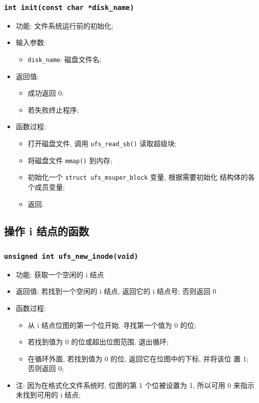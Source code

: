 \documentclass[nofonts, titlepage]{ctexart}
\begin{document}
\subsubsection[\texttt{init}]{\texttt{int init(const char *disk\_name)}}
        \begin{itemize}
\item
  功能: 文件系统运行前的初始化;
\item
  输入参数:

  \begin{itemize}
  \item
    \texttt{disk\_name}: 磁盘文件名;
  \end{itemize}
\item
  返回值:

  \begin{itemize}
  \item
    成功返回 0;
  \item
    若失败终止程序;
  \end{itemize}
\item
  函数过程:

  \begin{itemize}
  \item
    打开磁盘文件, 调用 \texttt{ufs\_read\_sb()} 读取超级块;
  \item
    将磁盘文件 \texttt{mmap()} 到内存;
  \item
    初始化一个 \texttt{struct ufs\_msuper\_block} 变量, 根据需要初始化
    结构体的各个成员变量;
  \item
    返回.
  \end{itemize}
  \end{itemize}
\subsection{操作 i 结点的函数}\label{ux7cfbux7edfux8c03ux7528ux63a5ux53e3}
  \subsubsection[\texttt{ufs\_new\_inode}]{\texttt{unsigned int ufs\_new\_inode(void)}}
  \begin{itemize}
\item
  功能: 获取一个空闲的 i 结点
\item
  返回值: 若找到一个空闲的 i 结点, 返回它的 i 结点号; 否则返回 0
\item
  函数过程:

  \begin{itemize}
  \item
    从 i 结点位图的第一个位开始, 寻找第一个值为 0 的位;
  \item
    若找到值为 0 的位或超出位图范围, 退出循环;
  \item
    在循环外面, 若找到值为 0 的位, 返回它在位图中的下标, 并将该位 置 1;
    否则返回 0;
  \end{itemize}
\item
  注: 因为在格式化文件系统时, 位图的第 1 个位被设置为 1, 所以可用 0
  来指示未找到可用的 i 结点;
  \end{itemize}
\end{document}
